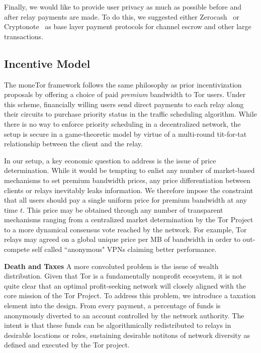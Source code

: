 Finally, we would like to provide user privacy as much as possible before and
after relay payments are made. To do this, we suggested either
Zerocash~\cite{sasson2014zerocash} or Cryptonote~\cite{van2013cryptonote} as
base layer payment protocols for channel escrow and other large transactions.

\subsection{Incentive Model}
The moneTor framework follows the same philosophy as prior incentivization
proposals by offering a choice of paid \emph{premium} bandwidth to Tor
users. Under this scheme, financially willing users send direct payments to each
relay along their circuits to purchase priority status in the traffic scheduling
algorithm. While there is no way to enforce priority scheduling in a
decentralized network, the setup is secure in a game-theoretic model by virtue
of a multi-round tit-for-tat relationship between the client and the relay.

In our setup, a key economic question to address is the issue of price
determination. While it would be tempting to enlist any number of market-based
mechanisms to set premium bandwidth prices, any price differentiation between
clients or relays inevitably leaks information. We therefore impose the
constraint that all users should pay a single uniform price for premium
bandwidth at any time $t$. This price may be obtained through any number of
transparent mechanisms ranging from a centralized market determination by the
Tor Project to a more dynamical consensus vote reached by the network. For example, Tor relays may agreed on a global unique price per MB of bandwidth in order to out-compete self called ``anonymous" VPNs claiming better performance.


\textbf{Death and Taxes} A more convoluted problem is the issue of wealth
distribution. Given that Tor is a fundamentally nonprofit ecosystem, it is not
quite clear that an optimal profit-seeking network will closely aligned with the
core mission of the Tor Project. To address this problem, we introduce a
taxation element into the design. From every payment, a percentage of funds is
anonymously diverted to an account controlled by the network authority. The
intent is that these funds can be algorithmically redistributed to relays in
desirable locations or roles, sustaining desirable notitons of network diversity
as defined and executed by the Tor project.
